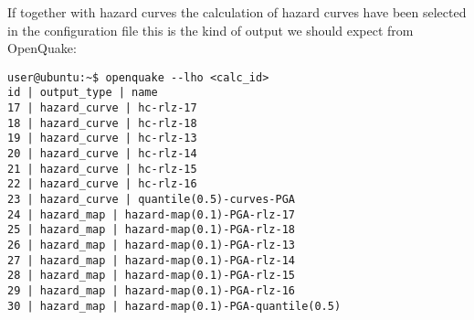 If together with hazard curves the calculation of hazard curves have 
been selected in the configuration file this is the kind of output
we should expect from OpenQuake:
\begin{Verbatim}[frame=single, commandchars=\\\{\}, fontsize=\small]
user@ubuntu:~$ openquake --lho <calc_id> 
id | output_type | name
17 | hazard_curve | hc-rlz-17
18 | hazard_curve | hc-rlz-18
19 | hazard_curve | hc-rlz-13
20 | hazard_curve | hc-rlz-14
21 | hazard_curve | hc-rlz-15
22 | hazard_curve | hc-rlz-16
23 | hazard_curve | quantile(0.5)-curves-PGA
24 | hazard_map | hazard-map(0.1)-PGA-rlz-17
25 | hazard_map | hazard-map(0.1)-PGA-rlz-18
26 | hazard_map | hazard-map(0.1)-PGA-rlz-13
27 | hazard_map | hazard-map(0.1)-PGA-rlz-14
28 | hazard_map | hazard-map(0.1)-PGA-rlz-15
29 | hazard_map | hazard-map(0.1)-PGA-rlz-16
30 | hazard_map | hazard-map(0.1)-PGA-quantile(0.5)
\end{Verbatim}

